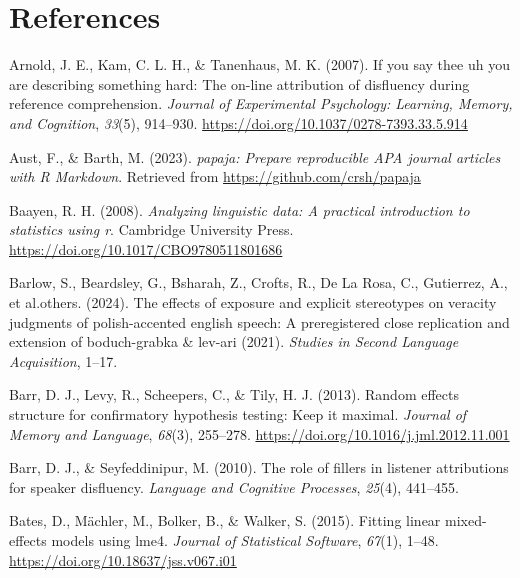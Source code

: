 \documentclass[
  man,floatsintext]{apa7}
\newlength{\cslhangindent}
\newlength{\cslentryspacingunit} %
\newenvironment{CSLReferences}[2] %
 {%
  \setlength{\parindent}{0pt}
  \ifodd #1
  \let\oldpar\par
  \def\par{\hangindent=\cslhangindent\oldpar}
  \fi
  \setlength{\parskip}{#2\cslentryspacingunit}
 }%
 {}
\begin{document}
\newpage

\hypertarget{references}{%
\section{References}\label{references}}

\hypertarget{refs}{}
\begin{CSLReferences}{1}{0}
\leavevmode{}%
Arnold, J. E., Kam, C. L. H., \& Tanenhaus, M. K. (2007). If you say thee uh you are describing something hard: The on-line attribution of disfluency during reference comprehension. \emph{Journal of Experimental Psychology: Learning, Memory, and Cognition}, \emph{33}(5), 914--930. \url{https://doi.org/10.1037/0278-7393.33.5.914}

\leavevmode{}%
Aust, F., \& Barth, M. (2023). \emph{{papaja}: {Prepare} reproducible {APA} journal articles with {R Markdown}}. Retrieved from \url{https://github.com/crsh/papaja}

\leavevmode{}%
Baayen, R. H. (2008). \emph{Analyzing linguistic data: A practical introduction to statistics using r}. Cambridge University Press. \url{https://doi.org/10.1017/CBO9780511801686}

\leavevmode{}%
Barlow, S., Beardsley, G., Bsharah, Z., Crofts, R., De La Rosa, C., Gutierrez, A., et al.others. (2024). The effects of exposure and explicit stereotypes on veracity judgments of polish-accented english speech: A preregistered close replication and extension of boduch-grabka \& lev-ari (2021). \emph{Studies in Second Language Acquisition}, 1--17.

\leavevmode{}%
Barr, D. J., Levy, R., Scheepers, C., \& Tily, H. J. (2013). Random effects structure for confirmatory hypothesis testing: Keep it maximal. \emph{Journal of Memory and Language}, \emph{68}(3), 255--278. \url{https://doi.org/10.1016/j.jml.2012.11.001}

\leavevmode{}%
Barr, D. J., \& Seyfeddinipur, M. (2010). The role of fillers in listener attributions for speaker disfluency. \emph{Language and Cognitive Processes}, \emph{25}(4), 441--455.

\leavevmode{}%
Bates, D., Mächler, M., Bolker, B., \& Walker, S. (2015). Fitting linear mixed-effects models using {lme4}. \emph{Journal of Statistical Software}, \emph{67}(1), 1--48. \url{https://doi.org/10.18637/jss.v067.i01}


\end{CSLReferences}
\end{document}
